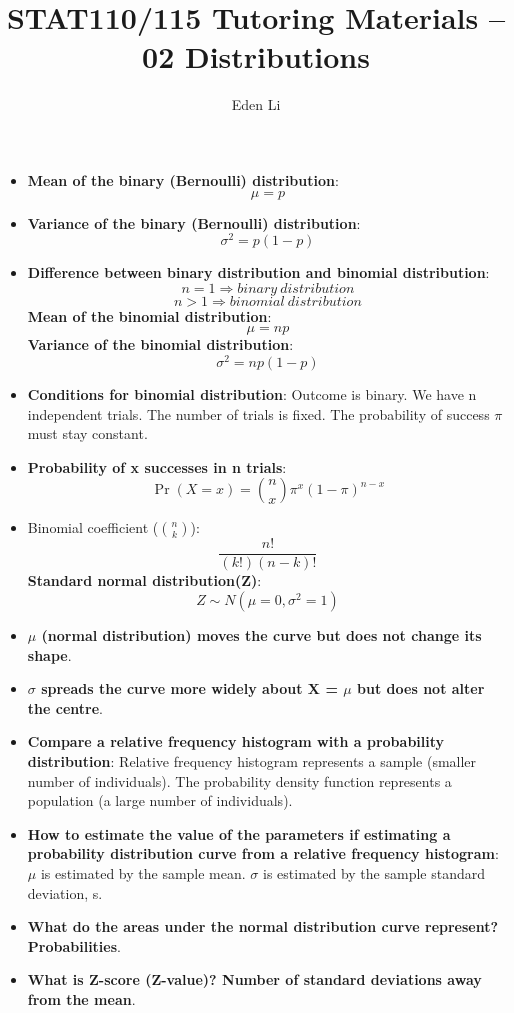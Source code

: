 \documentclass[12pt]{article}
\author{Eden Li}
\title{STAT110/115 Tutoring Materials – 02 Distributions}
\date{}
\begin{document}
\pagestyle{fancy}

\begin{itemize}
\item \textbf{Mean of the binary (Bernoulli) distribution}: $$\mu = p$$
\item \textbf{Variance of the binary (Bernoulli) distribution}: $$\sigma^2 = p (1 - p)$$
\item \textbf{Difference between binary distribution and binomial distribution}: $$n = 1 \Rightarrow binary \ distribution$$
$$n > 1 \Rightarrow binomial \ distribution$$
\textbf{Mean of the binomial distribution}:$$\mu=np$$
\textbf{Variance of the binomial distribution}:$$\sigma^2 = np(1-p)$$
\item \textbf{Conditions for binomial distribution}: Outcome is binary. We have n independent trials. The number of trials is fixed. The probability of success $\pi$ must stay constant.
\item \textbf{Probability of x successes in n trials}: $$ \Pr(X = x) = \binom{n}{x} \pi^x (1 - \pi)^{n - x} $$
\item Binomial coefficient ($\binom{n}{k}$): $$\frac{n!}{(k!)(n-k)!}$$
\textbf{Standard normal distribution(Z)}:$$Z \sim N (\mu = 0 ,\sigma^2 = 1)$$
\item \textbf{$\mu$ (normal distribution) moves the curve but does not change its shape}.
\item \textbf{$\sigma$ spreads the curve more widely about X = $\mu$ but does not alter the centre}.
\item \textbf{Compare a relative frequency histogram with a probability distribution}: Relative frequency histogram represents a sample (smaller number of individuals). The probability density function represents a population (a large number of individuals).
\item \textbf{How to estimate the value of the parameters if estimating a probability distribution curve from a relative frequency histogram}: $\mu$ is estimated by the sample mean. $\sigma$ is estimated by the sample standard deviation, s.
\item \textbf{What do the areas under the normal distribution curve represent? Probabilities}.
\item \textbf{What is Z-score (Z-value)? Number of standard deviations away from the mean}.

\end{itemize}
\end{document}
